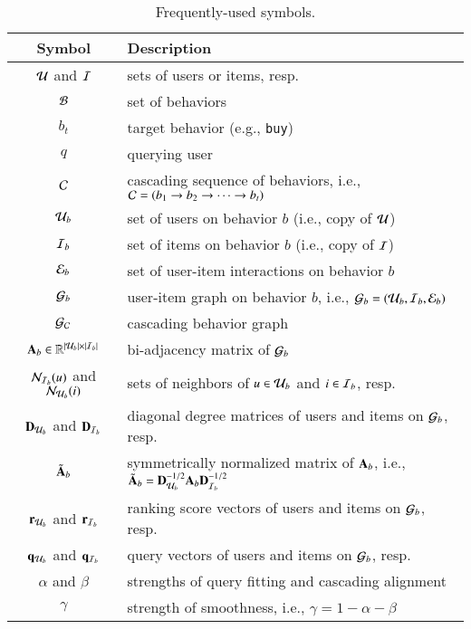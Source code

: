  \begin{table}
    \centering
    \small
    \caption{\label{tab:symbols}Frequently-used symbols.}
    \begin{tabular}{c|l}
        \toprule
        \textbf{Symbol} & \textbf{Description} \\
        \midrule
        $\mathcal{U}$ and $\mathcal{I}$ & sets of users or items, resp.\\
        $\mathcal{B}$ & set of behaviors \\         
        $b_t$ & target behavior (e.g., \texttt{buy}) \\ 
        $q$ & querying user \\ 
        $\mathcal{C}$ & cascading sequence of behaviors, i.e.,  $\mathcal{C}= (b_1 \rightarrow b_2 \rightarrow \cdots 
        \rightarrow b_t)$ \\
        $\mathcal{U}_{b}$ & set of users on behavior $b$ (i.e., copy of $\mathcal{U}$) \\
        $\mathcal{I}_{b}$ & set of items on behavior $b$ (i.e., copy of $\mathcal{I}$) \\
        $\mathcal{E}_{b}$ & set of user-item interactions on behavior $b$\\
        $\mathcal{G}_{b}$ & user-item graph on behavior $b$, i.e.,  $\mathcal{G}_{b} = (\mathcal{U}_{b}, \mathcal{I}_{b}, \mathcal{E}_{b})$ \\
        $\mathcal{G}_{\mathcal{C}}$ & cascading behavior graph\\
        $\mathbf{A}_{b} \in \mathbb{R}^{|\mathcal{U}_{b}| \times |\mathcal{I}_{b}|}$ & bi-adjacency matrix of $\mathcal{G}_{b}$\\
        $\mathcal{N}_{\mathcal{I}_{b}}(u)$ and $\mathcal{N}_{\mathcal{U}_{b}}(i)$ & sets of neighbors of $u \in \mathcal{U}_{b}$ and $i \in \mathcal{I}_{b}$, resp. \\
        $\mathbf{D}_{\mathcal{U}_{b}}$ and $\mathbf{D}_{\mathcal{I}_{b}}$ & diagonal degree matrices of users and items on $\mathcal{G}_{b}$, resp.\\
        $\tilde{\mathbf{A}}_{b}$ & symmetrically normalized matrix of $\mathbf{A}_{b}$, i.e., $\tilde{\mathbf{A}}_{b} = \mathbf{D}_{\mathcal{U}_{b}}^{-1/2} \mathbf{A}_{b} \mathbf{D}_{\mathcal{I}_{b}}^{-1/2}$\\ 
        $\mathbf{r}_{\mathcal{U}_{b}}$ and $\mathbf{r}_{\mathcal{I}_{b}}$ & ranking score vectors of users and items on $\mathcal{G}_{b}$, resp. \\
        $\mathbf{q}_{\mathcal{U}_{b}}$ and $\mathbf{q}_{\mathcal{I}_{b}}$ & query vectors of users and items on $\mathcal{G}_{b}$, resp. \\
        $\alpha$ and $\beta$ & strengths of query fitting and cascading alignment \\
        $\gamma$ & strength of smoothness, i.e., $\gamma = 1 - \alpha - \beta$\\
        \bottomrule
    \end{tabular}
\end{table}   

